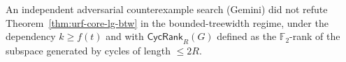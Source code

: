 
\begin{remark}
An independent adversarial counterexample search (Gemini) did not refute
Theorem~\ref{thm:urf-core-lg-btw} in the bounded-treewidth regime, under the
dependency $k\ge f(t)$ and with $\mathsf{CycRank}_{R}(G)$ defined as the
$\mathbb F_2$-rank of the subspace generated by cycles of length $\le 2R$.
\end{remark}

